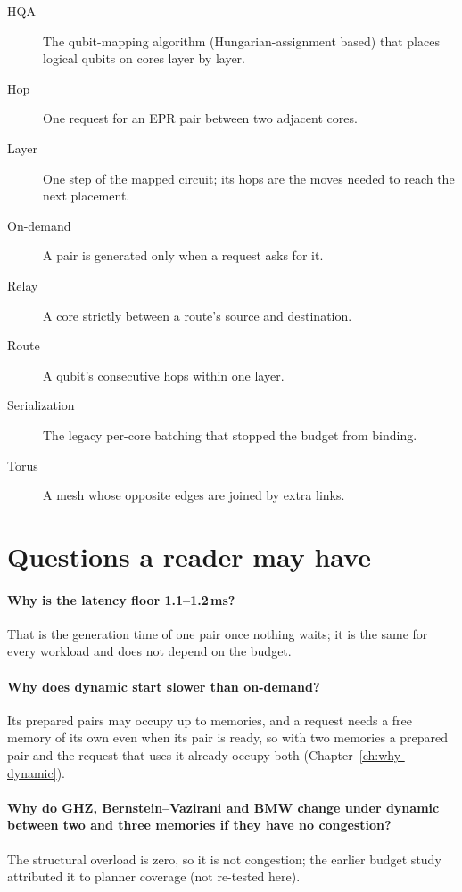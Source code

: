 \begin{description}
  \item[HQA] The qubit-mapping algorithm (Hungarian-assignment based) that places logical qubits on cores layer by layer.
  \item[Hop] One request for an EPR pair between two adjacent cores.
  \item[Layer] One step of the mapped circuit; its hops are the moves needed to reach the next placement.
  \item[On-demand] A pair is generated only when a request asks for it.
  \item[Relay] A core strictly between a route's source and destination.
  \item[Route] A qubit's consecutive hops within one layer.
  \item[Serialization] The legacy per-core batching that stopped the budget from binding.
  \item[Torus] A mesh whose opposite edges are joined by extra links.
\end{description}

\section{Questions a reader may have}
\paragraph{Why is the latency floor 1.1--1.2\,ms?} That is the generation time of one pair once nothing waits; it is the same for every workload and does not depend on the budget.

\paragraph{Why does dynamic start slower than on-demand?} Its prepared pairs may occupy up to  memories, and a request needs a free memory of its own even when its pair is ready, so with two memories a prepared pair and the request that uses it already occupy both (Chapter~\ref{ch:why-dynamic}).

\paragraph{Why do GHZ, Bernstein--Vazirani and BMW change under dynamic between two and three memories if they have no congestion?} The structural overload is zero, so it is not congestion; the earlier budget study attributed it to planner coverage (not re-tested here).

